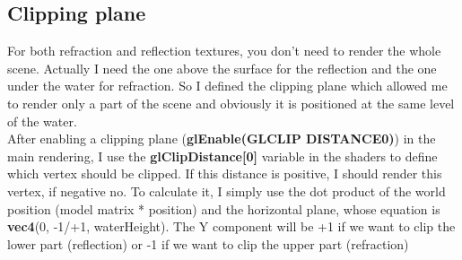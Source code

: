 \subsection{Clipping plane}
For both refraction and reflection textures, you don't need to render the whole scene. Actually I need the one above the surface for the reflection and the one under the water for refraction. So I defined the clipping plane which allowed me to render only a part of the scene and obviously it is positioned at the same level of the water. \\
After enabling a clipping plane (\textbf{glEnable(GL\textunderscore CLIP \textunderscore DISTANCE0)}) in the main rendering, I use the \textbf{gl\textunderscore ClipDistance[0]} variable in the shaders to define which vertex should be clipped. If this distance is positive, I should render this vertex, if negative no. To calculate it, I simply use the dot product of the world position (model matrix * position) and the horizontal plane, whose equation is \textbf{vec4}(0, -1/+1, waterHeight). The Y component will be +1 if we want to clip the lower part (reflection) or -1 if we want to clip the upper part (refraction)

\newpage

\begin{figure}[hbt!]
	\centering
	\qquad
	\caption{}
\end{figure}

